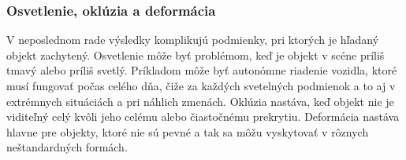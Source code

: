 \subsubsection{Osvetlenie, oklúzia a deformácia}
V neposlednom rade výsledky komplikujú podmienky, pri ktorých je hľadaný objekt zachytený. Osvetlenie môže byť problémom, keď je objekt v scéne príliš tmavý alebo príliš svetlý. Príkladom môže byť autonómne riadenie vozidla, ktoré musí fungovať počas celého dňa, čiže za každých svetelných podmienok a to aj v extrémnych situáciách a pri náhlich zmenách. Oklúzia nastáva, keď objekt nie je viditeľný celý kvôli jeho celému alebo čiastočnému prekrytiu. Deformácia nastáva hlavne pre objekty, ktoré nie sú pevné a tak sa môžu vyskytovať v rôznych neštandardných formách.